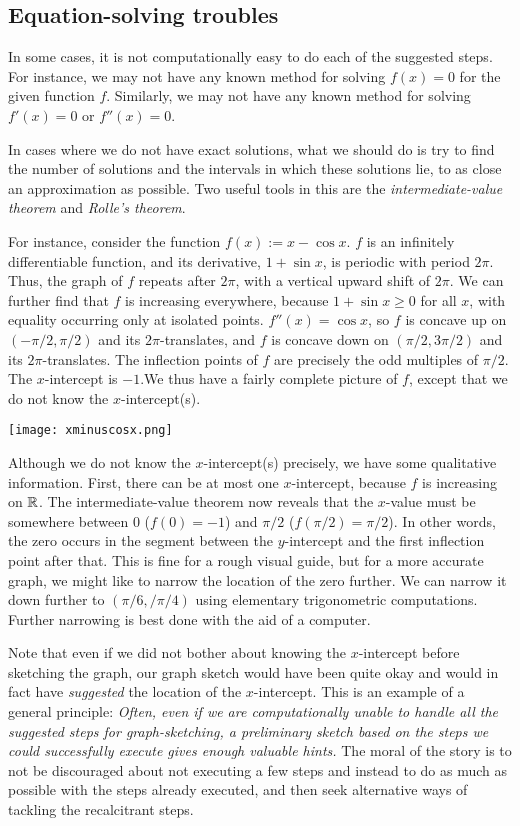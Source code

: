 \documentclass[10pt]{amsart}
\begin{document}
\subsection{Equation-solving troubles}

In some cases, it is not computationally easy to do each of the
suggested steps. For instance, we may not have any known method for
solving $f(x) = 0$ for the given function $f$. Similarly, we may not
have any known method for solving $f'(x) = 0$ or $f''(x) = 0$. 

In cases where we do not have exact solutions, what we should do is
try to find the number of solutions and the intervals in which these
solutions lie, to as close an approximation as possible. Two useful
tools in this are the {\em intermediate-value theorem} and {\em
Rolle's theorem}.

For instance, consider the function $f(x) := x - \cos x$. $f$ is an
infinitely differentiable function, and its derivative, $1 + \sin x$,
is periodic with period $2\pi$. Thus, the graph of $f$ repeats after
$2\pi$, with a vertical upward shift of $2\pi$. We can further find
that $f$ is increasing everywhere, because $1 + \sin x \ge 0$ for all
$x$, with equality occurring only at isolated points. $f''(x) = \cos
x$, so $f$ is concave up on $(-\pi/2,\pi/2)$ and its
$2\pi$-translates, and $f$ is concave down on $(\pi/2,3\pi/2)$ and its
$2\pi$-translates. The inflection points of $f$ are precisely the odd
multiples of $\pi/2$. The $x$-intercept is $-1$.We thus have a fairly
complete picture of $f$, except that we do not know the
$x$-intercept(s).

\texttt{[image: xminuscosx.png]}

Although we do not know the $x$-intercept(s) precisely, we have some
qualitative information. First, there can be at most one
$x$-intercept, because $f$ is increasing on $\mathbb{R}$. The
intermediate-value theorem now reveals that the $x$-value must be
somewhere between $0$ ($f(0) = -1$) and $\pi/2$ ($f(\pi/2) =
\pi/2$). In other words, the zero occurs in the segment between the
$y$-intercept and the first inflection point after that. This is fine
for a rough visual guide, but for a more accurate graph, we might like
to narrow the location of the zero further. We can narrow it down
further to $(\pi/6,/\pi/4)$ using elementary trigonometric
computations. Further narrowing is best done with the aid of a
computer.

Note that even if we did not bother about knowing the $x$-intercept
before sketching the graph, our graph sketch would have been quite
okay and would in fact have {\em suggested} the location of the
$x$-intercept. This is an example of a general principle: {\em Often,
even if we are computationally unable to handle all the suggested
steps for graph-sketching, a preliminary sketch based on the steps we
could successfully execute gives enough valuable hints.} The moral of
the story is to not be discouraged about not executing a few steps and
instead to do as much as possible with the steps already executed, and
then seek alternative ways of tackling the recalcitrant steps.
\end{document}

